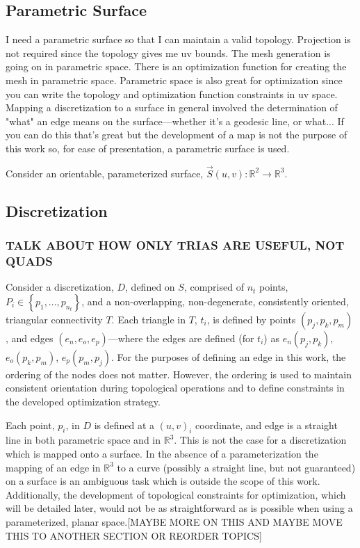 \subsection{Parametric Surface}
I need a parametric surface so that I can maintain a valid topology.
Projection is not required since the topology gives me uv bounds. The
mesh generation is going on in parametric space. There is an
optimization function for creating the mesh in parametric space. Parametric
space is also great for optimization since you can write the topology
and optimization function constraints in uv space. Mapping a
discretization to a surface in general involved the determination of
"what" an edge means on the surface---whether it's a geodesic line, or
what... If you can do this that's great but the development of a map
is not the purpose of this work so, for ease of presentation, a
parametric surface is used.

Consider an orientable, parameterized surface, $\vec{S}\left(u,v\right)
: {\mathbb R}^2 \rightarrow {\mathbb R}^3$.

\subsection{Discretization}
\subsubsection{TALK ABOUT HOW ONLY TRIAS ARE USEFUL, NOT QUADS}
Consider a discretization, $D$, defined on $S$, comprised of $n_t$
points, $P_i \in \left\{p_1,...,p_{n_t} \right\}$, and a
non-overlapping, non-degenerate, consistently oriented, triangular
connectivity $T$. Each triangle in $T$, $t_i$, is defined by points
$\left(p_j, p_k, p_m\right)$, and edges $\left(e_n, e_o,
e_p\right)$---where the edges are defined (for $t_i$) as $e_n
\left(p_j, p_k\right)$, $e_o \left(p_k, p_m\right)$, $e_p \left(p_m,
p_j\right)$. For the purposes of defining an edge in this work, the
ordering of the nodes does not matter. However, the ordering is used to
maintain consistent orientation during topological operations and to
define constraints in the developed optimization strategy.

Each point, $p_i$, in $D$ is defined at a $\left(u,v\right)_i$
coordinate, and edge is a straight line in both parametric space and in
${\mathbb R}^3$. This is not the case for a discretization which is
mapped onto a surface. In the absence of a parameterization the mapping
of an edge in ${\mathbb R}^3$ to a curve (possibly a straight line, but
    not guaranteed) on a surface is an ambiguous task which is outside
the scope of this work. Additionally, the development of topological
constraints for optimization, which will be detailed later, would not be
as straightforward as is possible when using a parameterized, planar
space.[MAYBE MORE ON THIS AND MAYBE MOVE THIS TO ANOTHER SECTION OR
REORDER TOPICS]

